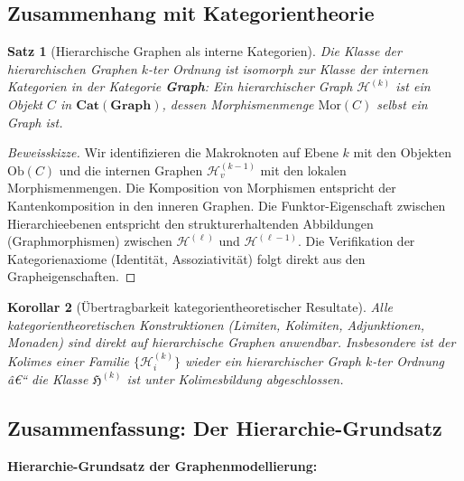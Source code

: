 ﻿\documentclass[12pt,a4paper,twoside]{article}
\theoremstyle{definition}
\theoremstyle{plain}
\newtheorem{theorem}{Satz}[section]
\newtheorem{korollar}[theorem]{Korollar}
\theoremstyle{remark}
\begin{document}
\subsection{Zusammenhang mit Kategorientheorie}
\label{sub:kategorien}

\begin{theorem}[Hierarchische Graphen als interne Kategorien]
	\label{thm:kat}
	Die Klasse der hierarchischen Graphen $k$-ter Ordnung ist isomorph
	zur Klasse der \emph{internen Kategorien} in der Kategorie
	\textbf{Graph}: Ein hierarchischer Graph $\mathcal{H}^{(k)}$ ist
	ein Objekt $C$ in $\mathbf{Cat}(\mathbf{Graph})$, dessen Morphismenmenge
	$\mathrm{Mor}(C)$ selbst ein Graph ist.
\end{theorem}

\begin{proof}[Beweisskizze]
	Wir identifizieren die Makroknoten auf Ebene $k$ mit den Objekten
	$\mathrm{Ob}(C)$ und die internen Graphen $\mathcal{H}^{(k-1)}_v$
	mit den lokalen Morphismenmengen.  Die Komposition von Morphismen
	entspricht der Kantenkomposition in den inneren Graphen.
	Die Funktor-Eigenschaft zwischen Hierarchieebenen entspricht den
	strukturerhaltenden Abbildungen (Graphmorphismen) zwischen
	$\mathcal{H}^{(\ell)}$ und $\mathcal{H}^{(\ell-1)}$.
	Die Verifikation der Kategorienaxiome (Identität, Assoziativität)
	folgt direkt aus den Grapheigenschaften.\qquad
\end{proof}

\begin{korollar}[Übertragbarkeit kategorientheoretischer Resultate]
	\label{kor:transfer}
	Alle kategorientheoretischen Konstruktionen (Limiten, Kolimiten,
	Adjunktionen, Monaden) sind direkt auf hierarchische Graphen
	anwendbar.  Insbesondere ist der Kolimes einer Familie
	$\{\mathcal{H}^{(k)}_i\}$ wieder ein hierarchischer Graph $k$-ter
	Ordnung â€“ die Klasse $\mathfrak{H}^{(k)}$ ist unter Kolimesbildung
	abgeschlossen.
\end{korollar}

\subsection{Zusammenfassung: Der Hierarchie-Grundsatz}
\label{sub:zusammenfassung_hierarchie}

	\textbf{Hierarchie-Grundsatz der Graphenmodellierung:}
	
\end{document}
